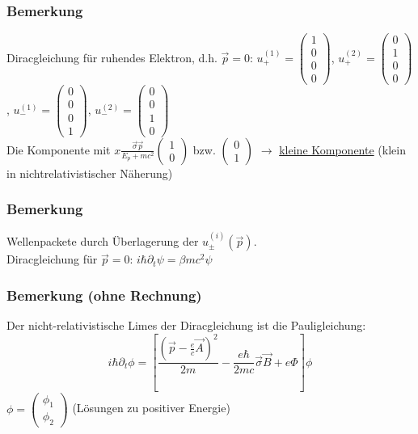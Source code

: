 \documentclass[twoside,a4paper]{scrartcl}
\renewcommand{\1}{\mathds{1}}
\newcommand{\ra}{\rightarrow}
\begin{document}
\subsubsection*{Bemerkung}
Diracgleichung für ruhendes Elektron, d.h. $\vec p=0$:
$u_+^{(1)}=\begin{pmatrix}1 \\ 0 \\ 0 \\ 0\end{pmatrix}$, $u_+^{(2)}=\begin{pmatrix}0 \\ 1 \\ 0 \\ 0\end{pmatrix}$, $u_-^{(1)}=\begin{pmatrix}0 \\ 0 \\ 0 \\1\end{pmatrix}$, $u_-^{(2)}=\begin{pmatrix}0 \\ 0 \\ 1 \\ 0\end{pmatrix}$\\
Die Komponente mit $x \frac{\vec \sigma \vec p}{E_p+mc^2} \begin{pmatrix}1 \\ 0 \end{pmatrix}$ bzw. $\begin{pmatrix}0 \\ 1 \end{pmatrix}$ $\ra$ \underline{kleine Komponente} (klein in nichtrelativistischer Näherung)
\subsubsection*{Bemerkung}
Wellenpackete durch Überlagerung der $u_\pm^{(i)}(\vec p)$.\\
Diracgleichung für $\vec p=0$: $i\hbar \partial_t \psi=\beta mc^2 \psi$
\subsubsection*{Bemerkung (ohne Rechnung)}
 Der nicht-relativistische Limes der Diracgleichung ist die Pauligleichung:
$$i \hbar \partial_t \phi=[\frac{(\vec p -\frac{e}{c}\vec A)^2}{2m}-\frac{e \hbar}{2mc}\vec \sigma \vec B+e\Phi]\phi$$
$\phi=\begin{pmatrix}\phi_1 \\ \phi_2\end{pmatrix}$ (Lösungen zu positiver Energie)
\end{document}
